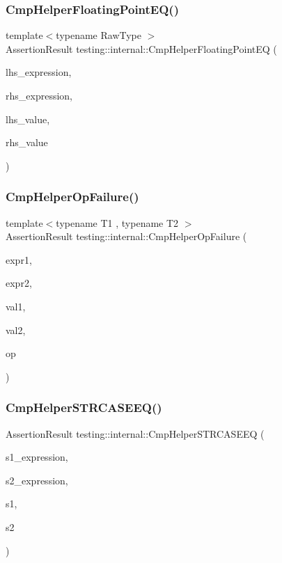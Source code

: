 \subsubsection{\texorpdfstring{CmpHelperFloatingPointEQ()}{CmpHelperFloatingPointEQ()}}
{\footnotesize\ttfamily template$<$typename Raw\+Type $>$ \\
Assertion\+Result testing\+::internal\+::\+Cmp\+Helper\+Floating\+Point\+EQ (\begin{DoxyParamCaption}\item[{const char $\ast$}]{lhs\+\_\+expression,  }\item[{const char $\ast$}]{rhs\+\_\+expression,  }\item[{Raw\+Type}]{lhs\+\_\+value,  }\item[{Raw\+Type}]{rhs\+\_\+value }\end{DoxyParamCaption})}

\mbox{\label{namespacetesting_1_1internal_a894ffccd936d78fd555f490020c27f0a}} 
\subsubsection{\texorpdfstring{CmpHelperOpFailure()}{CmpHelperOpFailure()}}
{\footnotesize\ttfamily template$<$typename T1 , typename T2 $>$ \\
Assertion\+Result testing\+::internal\+::\+Cmp\+Helper\+Op\+Failure (\begin{DoxyParamCaption}\item[{const char $\ast$}]{expr1,  }\item[{const char $\ast$}]{expr2,  }\item[{const T1 \&}]{val1,  }\item[{const T2 \&}]{val2,  }\item[{const char $\ast$}]{op }\end{DoxyParamCaption})}

\mbox{\label{namespacetesting_1_1internal_a30dfeb01f1bc8087c7d05205d5fa75c1}} 
\subsubsection{\texorpdfstring{CmpHelperSTRCASEEQ()}{CmpHelperSTRCASEEQ()}}
{\footnotesize\ttfamily Assertion\+Result testing\+::internal\+::\+Cmp\+Helper\+S\+T\+R\+C\+A\+S\+E\+EQ (\begin{DoxyParamCaption}\item[{const char $\ast$}]{s1\+\_\+expression,  }\item[{const char $\ast$}]{s2\+\_\+expression,  }\item[{const char $\ast$}]{s1,  }\item[{const char $\ast$}]{s2 }\end{DoxyParamCaption})}

